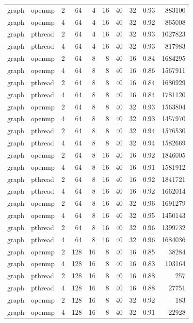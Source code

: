 \documentclass[a4paper]{article}
\begin{document}
{\begin{longtable}{lllrrrrrrr}
graph & openmp & 2 & 64 & 4 & 16 & 40 & 32 & 0.93 & 883100 \\
graph & openmp & 4 & 64 & 4 & 16 & 40 & 32 & 0.92 & 865008 \\
graph & pthread & 2 & 64 & 4 & 16 & 40 & 32 & 0.93 & 1027823 \\
graph & pthread & 4 & 64 & 4 & 16 & 40 & 32 & 0.93 & 817983 \\
graph & openmp & 2 & 64 & 8 & 8 & 40 & 16 & 0.84 & 1684295 \\
graph & openmp & 4 & 64 & 8 & 8 & 40 & 16 & 0.86 & 1567911 \\
graph & pthread & 2 & 64 & 8 & 8 & 40 & 16 & 0.84 & 1680929 \\
graph & pthread & 4 & 64 & 8 & 8 & 40 & 16 & 0.84 & 1781120 \\
graph & openmp & 2 & 64 & 8 & 8 & 40 & 32 & 0.93 & 1563804 \\
graph & openmp & 4 & 64 & 8 & 8 & 40 & 32 & 0.93 & 1457970 \\
graph & pthread & 2 & 64 & 8 & 8 & 40 & 32 & 0.94 & 1576530 \\
graph & pthread & 4 & 64 & 8 & 8 & 40 & 32 & 0.94 & 1582669 \\
graph & openmp & 2 & 64 & 8 & 16 & 40 & 16 & 0.92 & 1846005 \\
graph & openmp & 4 & 64 & 8 & 16 & 40 & 16 & 0.91 & 1581912 \\
graph & pthread & 2 & 64 & 8 & 16 & 40 & 16 & 0.92 & 1841721 \\
graph & pthread & 4 & 64 & 8 & 16 & 40 & 16 & 0.92 & 1662014 \\
graph & openmp & 2 & 64 & 8 & 16 & 40 & 32 & 0.96 & 1691279 \\
graph & openmp & 4 & 64 & 8 & 16 & 40 & 32 & 0.95 & 1450143 \\
graph & pthread & 2 & 64 & 8 & 16 & 40 & 32 & 0.96 & 1399732 \\
graph & pthread & 4 & 64 & 8 & 16 & 40 & 32 & 0.96 & 1684036 \\
graph & openmp & 2 & 128 & 16 & 8 & 40 & 16 & 0.85 & 38284 \\
graph & openmp & 4 & 128 & 16 & 8 & 40 & 16 & 0.83 & 103164 \\
graph & pthread & 2 & 128 & 16 & 8 & 40 & 16 & 0.88 & 257 \\
graph & pthread & 4 & 128 & 16 & 8 & 40 & 16 & 0.88 & 27751 \\
graph & openmp & 2 & 128 & 16 & 8 & 40 & 32 & 0.92 & 183 \\
graph & openmp & 4 & 128 & 16 & 8 & 40 & 32 & 0.91 & 22928 \\

\end{longtable}}
\end{document}
